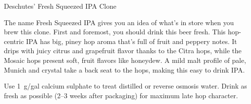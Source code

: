 \begin{recipie}{Deschutes' Fresh Squeezed IPA Clone}

\begin{aboutblock}
The name Fresh Squeezed IPA gives you an idea of what's in store when you brew this
clone. First and foremost, you should drink this beer fresh. This hop-centric IPA has
big, piney hop aroma that's full of fruit and peppery notes. It drips with juicy citrus
and grapefruit flavor thanks to the Citra hops, while the Mosaic hops present soft,
fruit flavors like honeydew. A mild malt profile of pale, Munich and crystal take a
back seat to the hops, making this easy to drink IPA.
\end{aboutblock}


\begin{methodandtiming}
 
\begin{mashsteps}
\end{mashsteps}

\begin{fermentationsteps}
\end{fermentationsteps}

\begin{directions}
Use 1~g/gal calcium sulphate to treat distilled or reverse
osmosis water. Drink as fresh as possible (2--3 weeks after packaging) for
maximum late hop character.
\end{directions}

\end{methodandtiming}

\pagebreak

\begin{ingredientsblock}

\begin{malts}
\end{malts}

\begin{hops}

\end{hops}

\begin{yeasts}
\end{yeasts}

\end{ingredientsblock}

\end{recipie}

